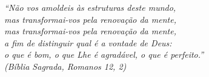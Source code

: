 
\begin{epigrafe}
	\vspace*{\fill}
	\begin{flushright}
		\textit{``Não vos amoldeis às estruturas deste mundo, \\
				mas transformai-vos pela renovação da mente, \\
				mas transformai-vos pela renovação da mente, \\
				a fim de distinguir qual é a vontade de Deus: \\
				o que é bom, o que Lhe é agradável, o que é perfeito.''\\
				(Bíblia Sagrada, Romanos 12, 2)}
	\end{flushright}
\end{epigrafe}